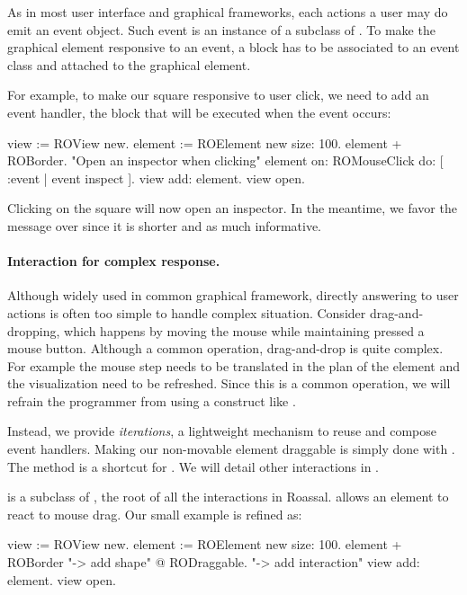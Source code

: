 \documentclass[a4paper,10pt,twoside]{book}
\begin{document}
As in most user interface and graphical frameworks, each actions a user may do emit an event object. Such event is an instance of a subclass of . To make the graphical element responsive to an event, a block has to be associated to an event class and attached to the graphical element.

For example, to make our square responsive to user click, we need to add an event handler, \ie the block that will be executed when the event occurs:

\begin{code}{}
view := ROView new.
element := ROElement new size: 100.
element + ROBorder. 
"Open an inspector when clicking"
element on: ROMouseClick do: [ :event | event inspect ]. 
view add: element.
view open.
\end{code}

Clicking on the square will now open an inspector. In the meantime, we favor the message \ct{+} over  since it is shorter and as much informative.

\paragraph{Interaction for complex response.}
Although widely used in common graphical framework, directly answering to user actions is often too simple to handle complex situation. Consider drag-and-dropping, which happens by moving the mouse while maintaining pressed a mouse button. Although a common operation, drag-and-drop is quite complex. For example the mouse step needs to be translated in the plan of the element and the visualization need to be refreshed. Since this is a common operation, we will refrain the programmer from using a construct like .

Instead, we provide \emph{iterations}, a lightweight mechanism to reuse and compose event handlers. Making our non-movable element draggable is simply done with . The  method is a shortcut for . We will detail other interactions in .

 is a subclass of , the root of all the interactions in Roassal.  allows an element to react to mouse drag. Our small example is refined as:

\begin{code}{}
view := ROView new.
element := ROElement new size: 100.
element 
	+ ROBorder "-> add shape"
	@ RODraggable. "-> add interaction"
view add: element.
view open.
\end{code}
\end{document}
